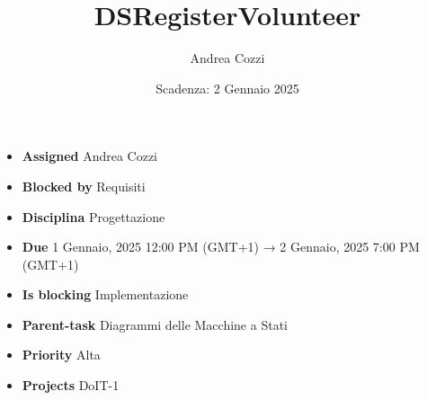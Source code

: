 \title{DSRegisterVolunteer}
\author{Andrea Cozzi}
\date{Scadenza: 2 Gennaio 2025}

\maketitle

\begin{itemize}
    \item \textbf{Assigned} Andrea Cozzi
    \item \textbf{Blocked by} Requisiti
    \item \textbf{Disciplina} Progettazione
    \item \textbf{Due} 1 Gennaio, 2025 12:00 PM (GMT+1) → 2 Gennaio, 2025 7:00 PM (GMT+1)
    \item \textbf{Is blocking} Implementazione
    \item \textbf{Parent-task} Diagrammi delle Macchine a Stati
    \item \textbf{Priority} Alta
    \item \textbf{Projects} DoIT-1
\end{itemize}